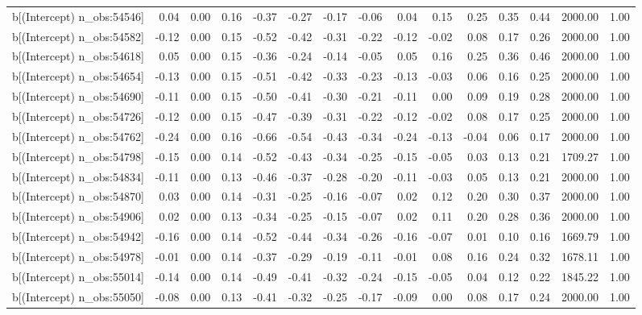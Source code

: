 \begin{table}[ht]
\begin{tabular}{rrrrrrrrrrrrrrr}
  b[(Intercept) n\_obs:54546] & 0.04 & 0.00 & 0.16 & -0.37 & -0.27 & -0.17 & -0.06 & 0.04 & 0.15 & 0.25 & 0.35 & 0.44 & 2000.00 & 1.00 \\ 
  b[(Intercept) n\_obs:54582] & -0.12 & 0.00 & 0.15 & -0.52 & -0.42 & -0.31 & -0.22 & -0.12 & -0.02 & 0.08 & 0.17 & 0.26 & 2000.00 & 1.00 \\ 
  b[(Intercept) n\_obs:54618] & 0.05 & 0.00 & 0.15 & -0.36 & -0.24 & -0.14 & -0.05 & 0.05 & 0.16 & 0.25 & 0.36 & 0.46 & 2000.00 & 1.00 \\ 
  b[(Intercept) n\_obs:54654] & -0.13 & 0.00 & 0.15 & -0.51 & -0.42 & -0.33 & -0.23 & -0.13 & -0.03 & 0.06 & 0.16 & 0.25 & 2000.00 & 1.00 \\ 
  b[(Intercept) n\_obs:54690] & -0.11 & 0.00 & 0.15 & -0.50 & -0.41 & -0.30 & -0.21 & -0.11 & 0.00 & 0.09 & 0.19 & 0.28 & 2000.00 & 1.00 \\ 
  b[(Intercept) n\_obs:54726] & -0.12 & 0.00 & 0.15 & -0.47 & -0.39 & -0.31 & -0.22 & -0.12 & -0.02 & 0.08 & 0.17 & 0.25 & 2000.00 & 1.00 \\ 
  b[(Intercept) n\_obs:54762] & -0.24 & 0.00 & 0.16 & -0.66 & -0.54 & -0.43 & -0.34 & -0.24 & -0.13 & -0.04 & 0.06 & 0.17 & 2000.00 & 1.00 \\ 
  b[(Intercept) n\_obs:54798] & -0.15 & 0.00 & 0.14 & -0.52 & -0.43 & -0.34 & -0.25 & -0.15 & -0.05 & 0.03 & 0.13 & 0.21 & 1709.27 & 1.00 \\ 
  b[(Intercept) n\_obs:54834] & -0.11 & 0.00 & 0.13 & -0.46 & -0.37 & -0.28 & -0.20 & -0.11 & -0.03 & 0.05 & 0.13 & 0.21 & 2000.00 & 1.00 \\ 
  b[(Intercept) n\_obs:54870] & 0.03 & 0.00 & 0.14 & -0.31 & -0.25 & -0.16 & -0.07 & 0.02 & 0.12 & 0.20 & 0.30 & 0.37 & 2000.00 & 1.00 \\ 
  b[(Intercept) n\_obs:54906] & 0.02 & 0.00 & 0.13 & -0.34 & -0.25 & -0.15 & -0.07 & 0.02 & 0.11 & 0.20 & 0.28 & 0.36 & 2000.00 & 1.00 \\ 
  b[(Intercept) n\_obs:54942] & -0.16 & 0.00 & 0.14 & -0.52 & -0.44 & -0.34 & -0.26 & -0.16 & -0.07 & 0.01 & 0.10 & 0.16 & 1669.79 & 1.00 \\ 
  b[(Intercept) n\_obs:54978] & -0.01 & 0.00 & 0.14 & -0.37 & -0.29 & -0.19 & -0.11 & -0.01 & 0.08 & 0.16 & 0.24 & 0.32 & 1678.11 & 1.00 \\ 
  b[(Intercept) n\_obs:55014] & -0.14 & 0.00 & 0.14 & -0.49 & -0.41 & -0.32 & -0.24 & -0.15 & -0.05 & 0.04 & 0.12 & 0.22 & 1845.22 & 1.00 \\ 
  b[(Intercept) n\_obs:55050] & -0.08 & 0.00 & 0.13 & -0.41 & -0.32 & -0.25 & -0.17 & -0.09 & 0.00 & 0.08 & 0.17 & 0.24 & 2000.00 & 1.00 \\ 

\end{tabular}
\end{table}
